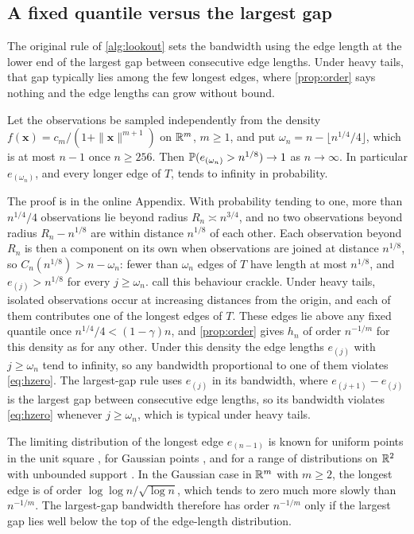 \subsection{A fixed quantile versus the largest gap}\label{sec:counterexample}

The original rule of \cref{alg:lookout} sets the bandwidth using the edge length at the lower end of the largest gap between consecutive edge lengths. Under heavy tails, that gap typically lies among the few longest edges, where \cref{prop:order} says nothing and the edge lengths can grow without bound.

\begin{counterexample}\label{cex:fattails}
  Let the observations be sampled independently from the density $f(\bm{x})=c_m/(1+\|\bm{x}\|^{m+1})$ on $\R^m$, $m\ge1$, and put $\omega_n=n-\lfloor n^{1/4}/4\rfloor$, which is at most $n-1$ once $n\ge256$. Then $\P(e_{(\omega_n)}>n^{1/8})\to1$ as $n\to\infty$. In particular $e_{(\omega_n)}$, and every longer edge of $T$, tends to infinity in probability.
\end{counterexample}

The proof is in the online Appendix. With probability tending to one, more than $n^{1/4}/4$ observations lie beyond radius $R_n\asymp n^{3/4}$, and no two observations beyond radius $R_n-n^{1/8}$ are within distance $n^{1/8}$ of each other. Each observation beyond $R_n$ is then a component on its own when observations are joined at distance $n^{1/8}$, so $C_n(n^{1/8})>n-\omega_n$: fewer than $\omega_n$ edges of $T$ have length at most $n^{1/8}$, and $e_{(j)}>n^{1/8}$ for every $j\ge\omega_n$. \citet{Crackle} call this behaviour crackle. Under heavy tails, isolated observations occur at increasing distances from the origin, and each of them contributes one of the longest edges of $T$. These edges lie above any fixed quantile once $n^{1/4}/4<(1-\gamma)n$, and \cref{prop:order} gives $h_n$ of order $n^{-1/m}$ for this density as for any other. Under this density the edge lengths $e_{(j)}$ with $j\ge\omega_n$ tend to infinity, so any bandwidth proportional to one of them violates \eqref{eq:hzero}. The largest-gap rule uses $e_{(j)}$ in its bandwidth, where $e_{(j+1)}-e_{(j)}$ is the largest gap between consecutive edge lengths, so its bandwidth violates \eqref{eq:hzero} whenever $j\ge\omega_n$, which is typical under heavy tails.

The limiting distribution of the longest edge $e_{(n-1)}$ is known for uniform points in the unit square \citep{Penrose1997}, for Gaussian points \citep{Penrose1998}, and for a range of distributions on $\R^2$ with unbounded support \citep{HsingRootzen2005}. In the Gaussian case in $\R^m$ with $m\ge2$, the longest edge is of order $\log\log n/\sqrt{\log n}$, which tends to zero much more slowly than $n^{-1/m}$. The largest-gap bandwidth therefore has order $n^{-1/m}$ only if the largest gap lies well below the top of the edge-length distribution.

